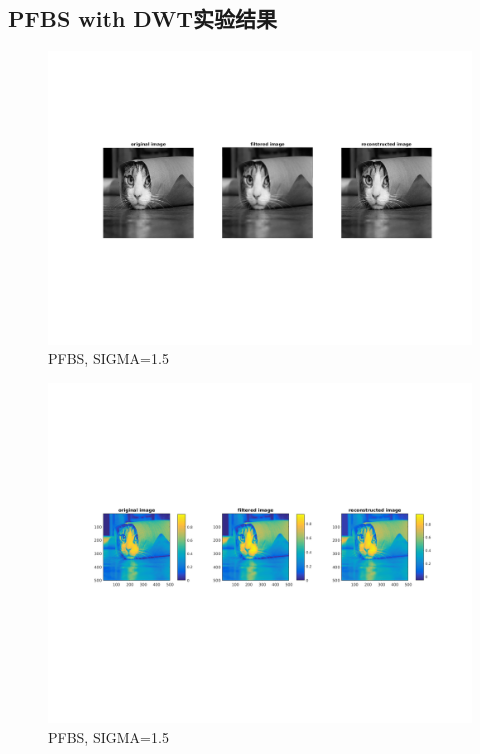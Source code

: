 \documentclass[a4paper, UTF8]{ctexrep}
\begin{document}
		\subsection{PFBS with DWT实验结果} %
			\begin{figure}[h]
				\centering
				\includegraphics[width=\textwidth]{hw4_fig7.png}
				\caption{PFBS, SIGMA=1.5}
				\label{fig:figure1}
			\end{figure}
			\clearpage
			\begin{figure}[h]
				\centering
				\includegraphics[width=\textwidth]{hw4_fig8.png}
				\caption{PFBS, SIGMA=1.5}
				\label{fig:figure1}
			\end{figure}
			\clearpage
\end{document}
